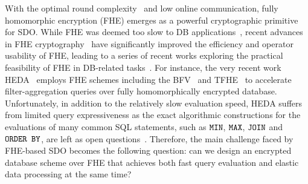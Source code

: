 With the optimal round complexity~\cite{mukherjee2016two} and
low online communication, fully homomorphic encryption (FHE) 
emerges as a powerful cryptographic primitive for SDO.
While FHE was deemed too slow to DB applications~\cite{shan2018practical}, 
recent advances in FHE 
cryptography~\cite{conversionhaochen, revisiting, pegasus, meta-bts}
have significantly improved the efficiency and operator usability of FHE,
leading to a series of recent works exploring the practical feasibility
of FHE in DB-related tasks~\cite{pegasus,cong2021labeled,heda}.
For instance, the very recent work HEDA~\cite{heda} employs FHE schemes including the 
BFV~\cite{DBLP:conf/crypto/brakerski12,DBLP:journals/iacr/FanV12} and 
TFHE~\cite{DBLP:journals/joc/ChillottiGGI20}  
to accelerate filter-aggregation queries over fully homomorphically 
encrypted database. Unfortunately, in addition to the relatively
slow evaluation speed, HEDA suffers from limited query expressiveness
as the exact algorithmic constructions for the evaluations of many 
common SQL statements, such as $\texttt{MIN}$, $\texttt{MAX}$, $\texttt{JOIN}$ and $\texttt{ORDER BY}$,
are left as open questions~\cite{heda}. %
Therefore, the main challenge faced by FHE-based SDO becomes the following question:
can we design an encrypted database scheme over FHE that achieves both fast query 
evaluation and elastic data processing at the same time?
